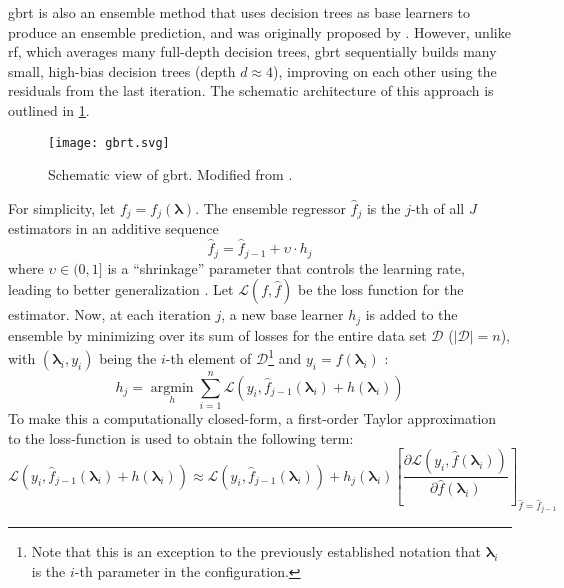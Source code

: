 \gls{gbrt} is also an ensemble method that uses decision trees as base learners to produce an ensemble prediction, and was originally proposed by \citet{friedman2001greedy}. However, unlike \gls{rf}, which averages many full-depth decision trees, \gls{gbrt} sequentially builds many small, high-bias decision trees (depth $d \approx 4$), improving on each other using the residuals from the last iteration. The schematic architecture of this approach is outlined in \cref{fig:gbrt}.
\begin{figure}
	\centering
	\texttt{[image: gbrt.svg]}
	\caption[Schematic view of \gls{gbrt}]{Schematic view of \gls{gbrt}. Modified from \citet{deng2021ensemble}.}
	\label{fig:gbrt}
\end{figure}
For simplicity, let $f_j = f_j(\mathbf{\lambda})$. The ensemble regressor $\hat{f}_j$ is the $j$-th of all $J$ estimators in an additive sequence 
\begin{equation}
	\label{eq:add-gbrt}
	\hat{f}_j = \hat{f}_{j-1} + \upsilon \cdot h_j
\end{equation}
where $\upsilon \in (0,1]$ is a \enquote{shrinkage} parameter that controls the learning rate, leading to better generalization \cite{friedman2002stochastic}.
Let $\mathcal{L}(f,\hat{f})$ be the loss function for the estimator. Now, at each iteration $j$, a new base learner $h_j$ is added to the ensemble by minimizing over its sum of losses for the entire data set $\mathcal{D}$ ($|\mathcal{D}| = n$), with $(\mathbf{\lambda}_i, y_i)$ being the $i$-th element of $\mathcal{D}$\footnote{Note that this is an exception to the previously established notation that $\mathbf{\lambda}_i$ is the $i$-th parameter in the configuration.} and $y_i = f(\mathbf{\lambda}_i)$ \cite{friedman2001greedy}:
\begin{equation}
	\label{eq:gbrt-tree}
	h_j = \operatorname*{argmin}_{h} \sum_{i=1}^{n} \mathcal{L}(y_i, \hat{f}_{j-1}(\mathbf{\lambda}_i) + h(\mathbf{\lambda}_i))
\end{equation}
To make this a computationally closed-form, a first-order Taylor approximation to the loss-function is used to obtain the following term:
\begin{equation}
	\mathcal{L}(y_i, \hat{f}_{j-1}(\mathbf{\lambda}_i) + h(\mathbf{\lambda}_i)) \approx \mathcal{L}(y_i, \hat{f}_{j-1}(\mathbf{\lambda}_i)) + h_j(\mathbf{\lambda}_i) \left[ \frac{\partial\mathcal{L}(y_i, \hat{f}(\mathbf{\lambda}_i))}{\partial \hat{f}(\mathbf{\lambda}_i)} \right]_{\hat{f}=\hat{f}_{j-1}}
\end{equation}
